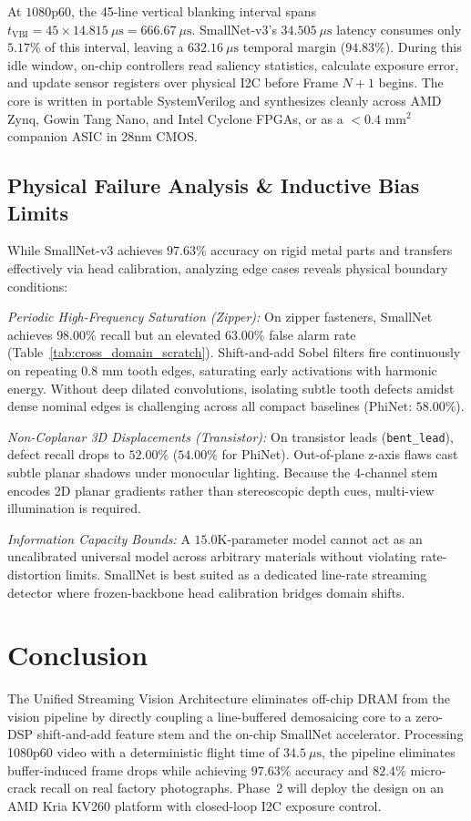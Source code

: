 \documentclass[conference]{IEEEtran}
\begin{document}
At $1080\text{p}60$, the 45-line vertical blanking interval spans $t_{\text{VBI}} = 45 \times 14.815\ \mu\text{s} = 666.67\ \mu\text{s}$. SmallNet-v3's $34.505\ \mu\text{s}$ latency consumes only $5.17\%$ of this interval, leaving a $632.16\ \mu\text{s}$ temporal margin ($94.83\%$). During this idle window, on-chip controllers read saliency statistics, calculate exposure error, and update sensor registers over physical I2C before Frame $N+1$ begins. The core is written in portable SystemVerilog and synthesizes cleanly across AMD Zynq, Gowin Tang Nano, and Intel Cyclone FPGAs, or as a $<0.4\text{ mm}^2$ companion ASIC in 28nm CMOS.

\subsection{Physical Failure Analysis \& Inductive Bias Limits}
While SmallNet-v3 achieves $97.63\%$ accuracy on rigid metal parts and transfers effectively via head calibration, analyzing edge cases reveals physical boundary conditions:

\textit{Periodic High-Frequency Saturation (Zipper):} On zipper fasteners, SmallNet achieves $98.00\%$ recall but an elevated $63.00\%$ false alarm rate (Table~\ref{tab:cross_domain_scratch}). Shift-and-add Sobel filters fire continuously on repeating $0.8\text{ mm}$ tooth edges, saturating early activations with harmonic energy. Without deep dilated convolutions, isolating subtle tooth defects amidst dense nominal edges is challenging across all compact baselines (PhiNet: $58.00\%$).

\textit{Non-Coplanar 3D Displacements (Transistor):} On transistor leads (\texttt{bent\_lead}), defect recall drops to $52.00\%$ ($54.00\%$ for PhiNet). Out-of-plane z-axis flaws cast subtle planar shadows under monocular lighting. Because the 4-channel stem encodes 2D planar gradients rather than stereoscopic depth cues, multi-view illumination is required.

\textit{Information Capacity Bounds:} A $15.0\text{K}$-parameter model cannot act as an uncalibrated universal model across arbitrary materials without violating rate-distortion limits. SmallNet is best suited as a dedicated line-rate streaming detector where frozen-backbone head calibration bridges domain shifts.

\section{Conclusion}
\label{sec:conclusion}
The Unified Streaming Vision Architecture eliminates off-chip DRAM from the vision pipeline by directly coupling a line-buffered demosaicing core to a zero-DSP shift-and-add feature stem and the on-chip SmallNet accelerator. Processing 1080p60 video with a deterministic flight time of $34.5\ \mu\text{s}$, the pipeline eliminates buffer-induced frame drops while achieving $97.63\%$ accuracy and $82.4\%$ micro-crack recall on real factory photographs. Phase~2 will deploy the design on an AMD Kria KV260 platform with closed-loop I2C exposure control.
\end{document}
